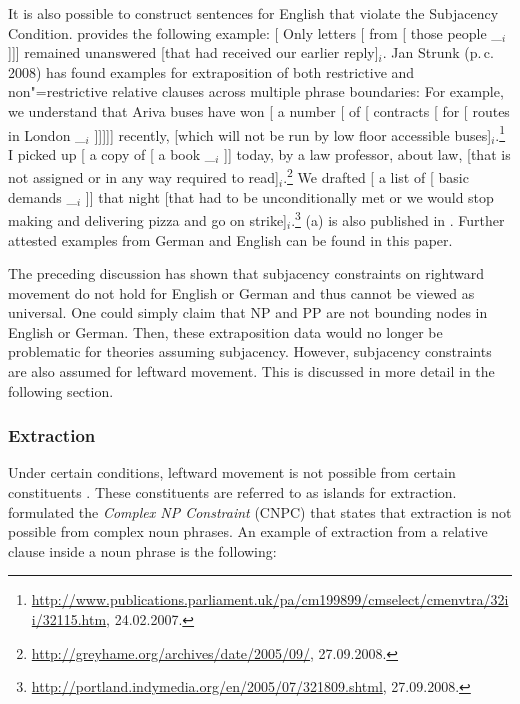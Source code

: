 \noindent
It is also possible to construct sentences for English that violate the Subjacency Condition.
\citet[]{Uszkoreit90a} provides the following example:
\ea
{}[ Only letters [ from [ those people \_$_i$]]] remained
unanswered [that had received our earlier reply]$_i$.
\z
%
Jan Strunk (p.\,c.\, 2008) has found examples for extraposition of both restrictive and non"=restrictive relative clauses across
multiple phrase boundaries:
\eal
\ex For example, we understand that Ariva buses have won [ a number [ of [
      contracts [ for [ routes in London \_$_i$ ]]]]] recently, [which will not be run
by low floor accessible buses]$_i$.\footnote{
\url{http://www.publications.parliament.uk/pa/cm199899/cmselect/cmenvtra/32ii/32115.htm},
24.02.2007.
}
\ex I picked up [ a copy of [ a book \_$_i$ ]] today, by a law
professor, about law, [that is not assigned or in any way required to read]$_i$.\footnote{
\url{http://greyhame.org/archives/date/2005/09/}, 27.09.2008.
}
\ex We drafted [ a list of [ basic demands \_$_i$ ]] that night [that had to be
  unconditionally met or we would stop making and 
delivering pizza and go on strike]$_i$.\footnote{
\url{http://portland.indymedia.org/en/2005/07/321809.shtml}, 27.09.2008.
}
\zl
(a) is also published in . Further attested examples from German and
English can be found in this paper.

The preceding discussion has shown that subjacency constraints on rightward movement do not hold for English or German and thus cannot be
viewed as universal. One could simply claim that NP and PP are not bounding nodes in English or German. Then, these extraposition data would
no longer be problematic for theories assuming subjacency. However, subjacency constraints are also
assumed for leftward movement. This is discussed in more detail in the following section. 

\subsubsection{Extraction}
\label{Abschnitt-Subjazenz-Extraktion}

Under certain conditions, leftward movement is not possible from certain constituents \citep{Ross67}. 
These constituents are referred to as islands for extraction. \citet[Section~4.1]{Ross67} formulated the \emph{Complex NP Constraint} (CNPC) that states that extraction is not possible from complex noun phrases. An example of extraction
  from a relative clause inside a noun phrase is the following:

